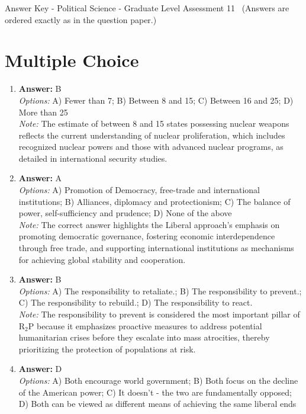 \documentclass[12pt]{article}
\begin{document}
\begin{center}
Answer Key - Political Science - Graduate Level Assessment 11 \
\small (Answers are ordered exactly as in the question paper.)
\end{center}

\section*{Multiple Choice}
\begin{enumerate}[label=\arabic*.]
\item \textbf{Answer:} B
\\ \textit{Options:} A) Fewer than 7; B) Between 8 and 15; C) Between 16 and 25; D) More than 25
\\ \textit{Note:} The estimate of between 8 and 15 states possessing nuclear weapons reflects the current understanding of nuclear proliferation, which includes recognized nuclear powers and those with advanced nuclear programs, as detailed in international security studies.
\item \textbf{Answer:} A
\\ \textit{Options:} A) Promotion of Democracy, free-trade and international institutions; B) Alliances, diplomacy and protectionism; C) The balance of power, self-sufficiency and prudence; D) None of the above
\\ \textit{Note:} The correct answer highlights the Liberal approach's emphasis on promoting democratic governance, fostering economic interdependence through free trade, and supporting international institutions as mechanisms for achieving global stability and cooperation.
\item \textbf{Answer:} B
\\ \textit{Options:} A) The responsibility to retaliate.; B) The responsibility to prevent.; C) The responsibility to rebuild.; D) The responsibility to react.
\\ \textit{Note:} The responsibility to prevent is considered the most important pillar of R$_{2}$P because it emphasizes proactive measures to address potential humanitarian crises before they escalate into mass atrocities, thereby prioritizing the protection of populations at risk.
\item \textbf{Answer:} D
\\ \textit{Options:} A) Both encourage world government; B) Both focus on the decline of the American power; C) It doesn't - the two are fundamentally opposed; D) Both can be viewed as different means of achieving the same liberal ends

\end{enumerate}
\end{document}
